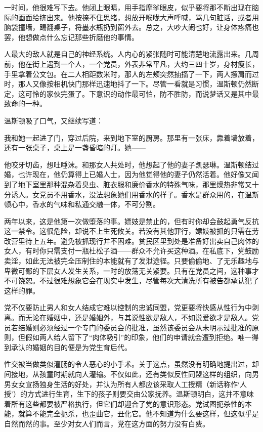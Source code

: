 一时间，他很难写下去。他闭上眼睛，用手指摩挲眼皮，似乎要将那不断出现在脑际的画面给挤出来。他按捺不住思绪，想放开喉咙大声呼喊，骂几句脏话，或者用脑袋撞墙，踢翻桌子，将墨水瓶扔到窗外去。总之，大吵大闹也好，让身体疼痛也罢，他想做点什么忘记那些折磨他的事情。

人最大的敌人就是自己的神经系统。人内心的紧张随时可能清楚地流露出来。几周前，他在街上遇到一个人，一个党员，外表非常平凡，大约三四十岁，身材瘦长，手里拿着公文包。在二人相距数米时，那人的左颊突然抽搐了一下，两人擦肩而过时，那人又像按相机快门那样迅速地抖了一下。尽管一看就是习惯，温斯顿仍然断定，这可怜的家伙完蛋了。下意识的动作最可怕，防不胜防，而说梦话又是其中最致命的一种。

温斯顿吸了口气，又继续写道：

我和她一起进了门，穿过后院，来到地下室的厨房。那里有一张床，靠着墙放着，还有一张桌子，桌上是一盏昏暗的灯。她------

他咬牙切齿，想吐唾沫。和那女人共处时，他想起了他的妻子凯瑟琳。温斯顿结过婚，也许现在，他仍算得上已婚人士，因为他觉得他的妻子仍然活着。他好像又闻到了地下室里那种混杂着臭虫、脏衣服和廉价香水的特殊气味，那里燥热非常又十分诱人。女党员不用香水，没法想象她们用香水的样子。香水是群众用的，在温斯顿心中，香水的气味和私通交融一体，不可分割。

两年以来，这是他第一次做堕落的事。嫖妓是禁止的，但有时你却会鼓起勇气反抗这一禁令。这很危险，却说不上生死攸关。若没有其他罪行，嫖妓被抓的只需在劳改营里待上五年。避免被抓现行并不困难。贫民区里到处是准备好出卖自己肉体的女人，有时你只需支付一瓶杜松子酒------群众不允许买这种酒。在私底下，党鼓励卖淫，如此无法被完全压制住的本能就有了发泄途径。只要偷偷地、了无乐趣地与卑微可鄙的下层女人发生关系，一时的放荡无关紧要。只有在党员之间，这种事才不可饶恕。不过很难想象它会在现实中发生，尽管每次大清洗所有被告都承认犯了这样的罪。

党不仅要防止男人和女人结成它难以控制的忠诚同盟，党更要将快感从性行为中剥离。而无论在婚姻中，还是婚姻外，与其说性欲是敌人，不如说爱欲才是敌人。党员若结婚则必须经过一个专门的委员会的批准，虽然该委员会从未明示过批准的原则，但假如两人给人留下了``肉体吸引''的印象，他们的申请就会遭到拒绝。唯一得到承认的婚姻的目的便是为党生育后代。

性交被当做类似灌肠的令人恶心的小手术。关于这点，虽然没有明确地提出过，却间接地，从孩童时期就向人灌输。不仅如此，还有类似反性同盟这样的组织，向男男女女宣扬独身生活的好处，并认为所有人都应该采取人工授精（新话称作`人授'）的方式进行生育，生下的孩子则要交由公家抚养。温斯顿明白，这并不意味着所有这些都要被严格执行，但它们却迎合了党的意识形态。党试图扼杀性的本能，就算不能完全扼杀，也歪曲它，丑化它。他不知道为什么要这样，但这似乎是自然而然的事。至少对女人们而言，党在这方面的努力没有白费。

